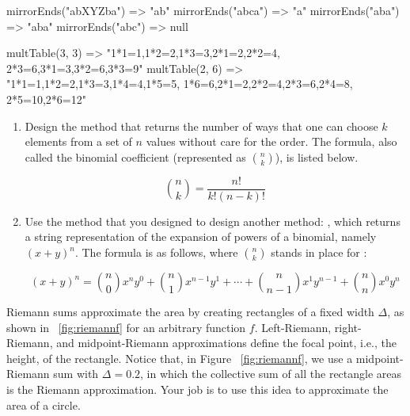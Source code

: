 \begin{verbnobox}[\small]
mirrorEnds("abXYZba") => "ab"
mirrorEnds("abca")    => "a"
mirrorEnds("aba")     => "aba"
mirrorEnds("abc")     => null
\end{verbnobox}

\begin{verbnobox}[\small]
multTable(3, 3) => "1*1=1,1*2=2,1*3=3,2*1=2,2*2=4,
                    2*3=6,3*1=3,3*2=6,3*3=9"
multTable(2, 6) => "1*1=1,1*2=2,1*3=3,1*4=4,1*5=5,
                    1*6=6,2*1=2,2*2=4,2*3=6,2*4=8,
                    2*5=10,2*6=12"
\end{verbnobox}

\begin{enumerate}[label=(\alph*)]
    \item Design the  method that returns the number of ways that one can choose $k$ elements from a set of $n$ values without care for the order. The formula, also called the binomial coefficient (represented as $\binom{n}{k}$), is listed below.
    
\[
    \binom{n}{k} = \dfrac{n!}{k!(n - k)!}
\]

    \item Use the  method that you designed to design another method: , which returns a string representation of the expansion of powers of a binomial, namely $(x + y)^n$. The formula is as follows, where $\binom{n}{k}$ stands in place for :

    \[
    (x + y)^n = \binom{n}{0}x^ny^0 + \binom{n}{1}x^{n-1}y^1 + \cdots + \binom{n}{n-1}x^1y^{n-1} + \binom{n}{n}x^0y^n
    \]
\end{enumerate}

 Riemann sums approximate the area by creating rectangles of a fixed width $\Delta$, as shown in ~\ref{fig:riemannf} for an arbitrary function $f$. Left-Riemann, right-Riemann, and midpoint-Riemann approximations define the focal point, i.e., the height, of the rectangle. Notice that, in Figure ~\ref{fig:riemannf}, we use a midpoint-Riemann sum with $\Delta = 0.2$, in which the collective sum of all the rectangle areas is the Riemann approximation. Your job is to use this idea to approximate the area of a circle.

